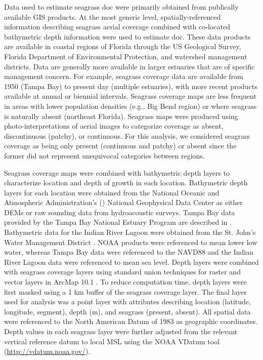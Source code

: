 \documentclass[letterpaper,12pt,oneside]{article}\usepackage[]{graphicx}\usepackage[]{color}
\begin{document}
Data used to estimate seagrass \ac{doc} were primarily obtained from publically available \ac{GIS} products.  At the most generic level, spatially-referenced information describing seagrass aerial coverage combined with co-located bathymetric depth information were used to estimate \ac{doc}.  These data products are available in coastal regions of Florida through the US Geological Survey, Florida Department of Environmental Protection, and watershed management districts.  Data are generally more available in larger estuaries that are of specific management concern.  For example, seagrass coverage data are available from 1950 (Tampa Bay) to present day (multiple estuaries), with more recent products available at annual or  biennial intervals.  Seagrass coverage maps are less frequent in areas with lower population densities (e.g., Big Bend region) or where seagrass is naturally absent (northeast Florida).  Seagrass maps were produced using photo-interpretations of aerial images to categorize coverage as absent, discontinuous (patchy), or continuous.  For this analysis, we considered seagrass coverage as being only present (continuous and patchy) or absent since the former did not represent unequivocal categories between regions. 

Seagrass coverage maps were combined with bathymetric depth layers to characterize location and depth of growth in each location.  Bathymetric depth layers for each location were obtained from the National Oceanic and Atmospheric Administration's () National Geophysical Data Center as either \acp{DEM} or raw sounding data from hydroacoustic surveys.  Tampa Bay data provided by the Tampa Bay National Estuary Program are described in \citet{Tyler07}. Bathymetric data for the Indian River Lagoon were obtained from the St. John's Water Management District \citep{CPE97}.  \ac{NOAA} products were referenced to mean lower low water, whereas Tampa Bay data were referenced to the \ac{NAVD88} and the Indian River Lagoon data were referenced to mean sea level.  Depth layers were combined with seagrass coverage layers using standard union techniques for raster and vector layers in ArcMap 10.1 \citep{ESRI12}.  To reduce computation time, depth layers were first masked using a 1 km buffer of the seagrass coverage layer.  The final layer used for analysis was a point layer with attributes describing location (latitude, longitude, segment), depth (m), and seagrass (present, absent).  All spatial data were referenced to the North American Datum of 1983 as geographic coordinates.  Depth values in each seagrass layer were further adjusted from the relevant vertical reference datum to local \ac{MSL} using the \ac{NOAA} VDatum tool (\url{http://vdatum.noaa.gov/}).
\end{document}
